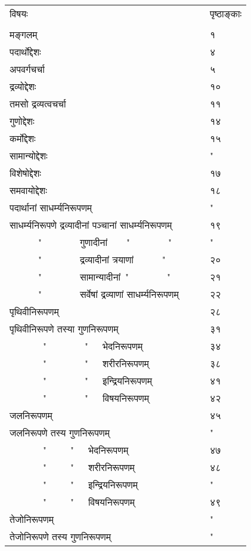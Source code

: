 \documentclass[11pt, openany]{book}
\makeatletter
\newcommand{\devanagarinumeral}[1]{%
	\devanagaridigits{\number \csname c@#1\endcsname}} %
\makeatother
\begin{document}
\noindent
\begin{tabular}{m{28em} m{2em}}
विषयः & पृष्ठाङ्काः\\
 & \\
मङ्गलम् & १\\
पदार्थोद्देशः & ४\\
अपवर्गचर्चा & ५\\
द्रव्योद्देशः & १०\\
तमसो द्रव्यत्वचर्चा & ११\\
गुणोद्देशः & १४\\
कर्मोद्देशः & १५\\
सामान्योद्देशः & "\\
विशेषोद्देशः & १७\\
समवायोद्देशः & १८\\
पदार्थानां साधर्म्यनिरूपणम् & "\\
साधर्म्यनिरूपणे द्रव्यादीनां पञ्चानां साधर्म्यनिरूपणम् & १९\\
~~~~~~"~~~~~~~~गुणादीनां~~~~"~~~~~~~~"~~~~~~ & "\\
~~~~~~"~~~~~~~~द्रव्यादीनां त्रयाणां~~~~~~"~~~~~~ & २०\\
~~~~~~"~~~~~~~~सामान्यादीनां~"~~~~~~~~" & २१\\
~~~~~~"~~~~~~~~सर्वेषां द्रव्याणां साधर्म्यनिरूपणम् & २२\\
पृथिवीनिरूपणम् & २८\\
पृथिवीनिरूपणे तस्या गुणनिरूपणम् & ३१\\
~~~~~~~"~~~~~~~~"~~~भेदनिरूपणम् & ३४\\
~~~~~~~"~~~~~~~~"~~~शरीरनिरूपणम् & ३८\\
~~~~~~~"~~~~~~~~"~~~इन्द्रियनिरूपणम् & ४१\\
~~~~~~~"~~~~~~~~"~~~विषयनिरूपणम् & ४२\\
जलनिरूपणम् & ४५\\
जलनिरूपणे तस्य गुणनिरूपणम् & "\\
~~~~~~~"~~~~~"~~~भेदनिरूपणम् & ४७\\
~~~~~~~"~~~~~"~~~शरीरनिरूपणम् & ४८\\
~~~~~~~"~~~~~"~~~इन्द्रियनिरूपणम् & "\\
~~~~~~~"~~~~~"~~~विषयनिरूपणम् &४९\\
तेजोनिरूपणम् & "\\
तेजोनिरूपणे तस्य गुणनिरूपणम् & "\\
\end{tabular}

\afterpage{\fancyhead[CE,CO]{\thepage}}
\cfoot{}
\newpage
\renewcommand{\thepage}{\devanagarinumeral{page}}
\setcounter{page}{2}
\end{document}
